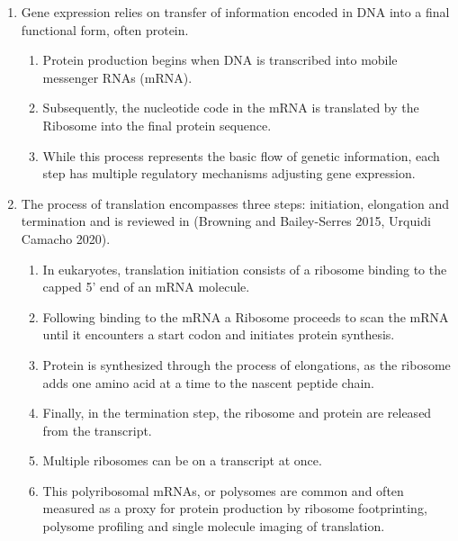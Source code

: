 \documentclass[review]{elsarticle}
\begin{document}
\begin{enumerate}
\item Gene expression relies on transfer of information encoded in DNA into a final functional form, often protein. 
\begin{enumerate}	
  \item Protein production begins when DNA is transcribed into mobile messenger RNAs (mRNA).
  \item Subsequently, the nucleotide code in the mRNA is translated by the Ribosome into the final protein sequence. 
  \item While this process represents the basic flow of genetic information, each step has multiple regulatory mechanisms adjusting gene expression.  
\end{enumerate}

\item The process of translation encompasses three steps: initiation, elongation and termination and is reviewed in (Browning and Bailey-Serres 2015, Urquidi Camacho 2020).
\begin{enumerate}	
  \item In eukaryotes, translation initiation consists of a ribosome binding to the capped 5' end of an mRNA molecule. 
  \item Following binding to the mRNA a Ribosome proceeds to scan the mRNA until it encounters a start codon and initiates protein synthesis.
  \item Protein is synthesized through the process of elongations, as the ribosome adds one amino acid at a time to the nascent peptide chain. 
  \item Finally, in the termination step, the ribosome and protein are released from the transcript.
  \item Multiple ribosomes can be on a transcript at once. 
  \item This polyribosomal mRNAs, or polysomes are common and often measured as a proxy for protein production by ribosome footprinting, polysome profiling and single molecule imaging of translation. 
\end{enumerate}


\end{enumerate}
\end{document}
